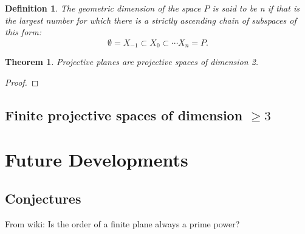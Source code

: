 \documentclass[12pt]{article}
\newtheorem{theorem}{Theorem}
\newtheorem{definition}{Definition}
\begin{document}
    \begin{definition}
        The geometric dimension of the space $P$ is said to be n if that is the largest number for which there is a strictly ascending chain of subspaces of this form:
        \[\emptyset = X_{-1}\subset X_{0}\subset \cdots X_{n}=P.\]
    \end{definition}

    \begin{theorem}
        Projective planes are projective spaces of dimension 2.
    \end{theorem}

    \begin{proof}
    \end{proof}

    \subsection{Finite projective spaces of dimension $\geq 3$ }


    \section{Future Developments}

    \subsection{Conjectures}

    From wiki: Is the order of a finite plane always a prime power?

    
    
\end{document}
